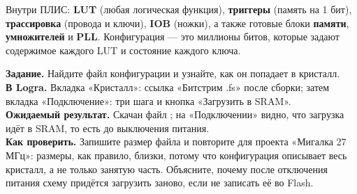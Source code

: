 \begin{ideabox}
Внутри ПЛИС: \textbf{LUT} (любая логическая функция), \textbf{триггеры}
(память на 1 бит), \textbf{трассировка} (провода и ключи), \textbf{IOB}
(ножки), а также готовые блоки \textbf{памяти}, \textbf{умножителей} и
\textbf{PLL}. Конфигурация --- это миллионы битов, которые задают
содержимое каждого LUT и состояние каждого ключа.
\end{ideabox}

\begin{diybox}
\textbf{Задание.} Найдите файл конфигурации и узнайте, как он попадает в кристалл.\\
\textbf{В Logra.} Вкладка «Кристалл»: ссылка «Битстрим .fs» после сборки; затем вкладка «Подключение»: три шага и кнопка «Загрузить в SRAM».\\
\textbf{Ожидаемый результат.} Скачан файл ; на «Подключении» видно, что загрузка идёт в SRAM, то есть до выключения питания.\\
\textbf{Как проверить.} Запишите размер файла и повторите для проекта «Мигалка 27 МГц»: размеры, как правило, близки, потому что конфигурация описывает весь кристалл, а не только занятую часть.  Объясните, почему после отключения питания схему придётся загрузить заново, если не записать её во Flash.
\end{diybox}
